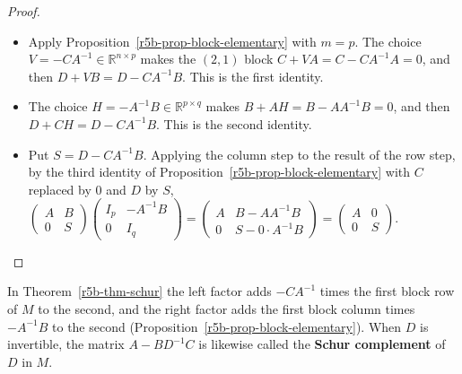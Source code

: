 \documentclass[12pt]{article}
\newcommand{\R}{\mathbb R}
\theoremstyle{definition}
\begin{document}
\begin{proof}
\begin{itemize}
\item Apply Proposition~\ref{r5b-prop-block-elementary} with \(m=p\). The choice
\(V=-CA^{-1}\in\R^{n\times p}\) makes the \((2,1)\) block \(C+VA=C-CA^{-1}A=0\), and then
\(D+VB=D-CA^{-1}B\). This is the first identity.
\item The choice \(H=-A^{-1}B\in\R^{p\times q}\) makes \(B+AH=B-AA^{-1}B=0\), and then
\(D+CH=D-CA^{-1}B\). This is the second identity.
\item Put \(S=D-CA^{-1}B\). Applying the column step to the result of the row step, by the third
identity of Proposition~\ref{r5b-prop-block-elementary} with \(C\) replaced by \(0\) and \(D\) by
\(S\),
\(\left(\begin{smallmatrix}A&B\\0&S\end{smallmatrix}\right)\left(\begin{smallmatrix}I_p&-A^{-1}B\\0&I_q\end{smallmatrix}\right)
=\left(\begin{smallmatrix}A&B-AA^{-1}B\\0&S-0\cdot A^{-1}B\end{smallmatrix}\right)=\left(\begin{smallmatrix}A&0\\0&S\end{smallmatrix}\right)\).\qedhere
\end{itemize}
\end{proof}
In Theorem~\ref{r5b-thm-schur} the left factor adds \(-CA^{-1}\) times the first block row of \(M\) to
the second, and the right factor adds the first block column times \(-A^{-1}B\) to the second
(Proposition~\ref{r5b-prop-block-elementary}). When \(D\) is invertible, the matrix \(A-BD^{-1}C\) is
likewise called the \textbf{Schur complement} of \(D\) in \(M\).
\end{document}
